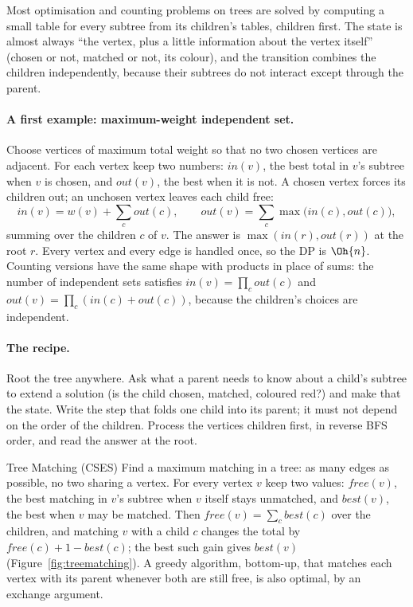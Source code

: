 Most optimisation and counting problems on trees are solved by computing a small table for every subtree from its children's tables,
children first. The state is almost always ``the vertex, plus a little information about the vertex itself'' (chosen or not, matched
or not, its colour), and the transition combines the children independently, because their subtrees do not interact except through
the parent.

\paragraph{A first example: maximum-weight independent set.} Choose vertices of maximum total weight so that no two chosen vertices
are adjacent. For each vertex keep two numbers: $\mathit{in}(v)$, the best total in $v$'s subtree when $v$ is chosen, and
$\mathit{out}(v)$, the best when it is not. A chosen vertex forces its children out; an unchosen vertex leaves each child free:
\[
  \mathit{in}(v) = w(v) + \sum_{c} \mathit{out}(c), \qquad \mathit{out}(v) = \sum_{c} \max\bigl(\mathit{in}(c), \mathit{out}(c)\bigr),
\]
summing over the children $c$ of $v$. The answer is $\max(\mathit{in}(r), \mathit{out}(r))$ at the root $r$. Every vertex and every
edge is handled once, so the DP is $\Oh{n}$. Counting versions have the same shape with products in place of sums: the number of
independent sets satisfies $\mathit{in}(v) = \prod_c \mathit{out}(c)$ and $\mathit{out}(v) = \prod_c (\mathit{in}(c) +
\mathit{out}(c))$, because the children's choices are independent.

\paragraph{The recipe.} Root the tree anywhere. Ask what a parent needs to know about a child's subtree to extend a solution (is the
child chosen, matched, coloured red?) and make that the state. Write the step that folds one child into its parent; it must not
depend on the order of the children. Process the vertices children first, in reverse BFS order, and read the answer at the root.

\begin{problem}{Tree Matching (CSES)}
Find a maximum matching in a tree: as many edges as possible, no two sharing a vertex.
\solution For every vertex $v$ keep two values: $\mathit{free}(v)$, the best matching in $v$'s subtree when $v$ itself stays
unmatched, and $\mathit{best}(v)$, the best when $v$ may be matched. Then $\mathit{free}(v) = \sum_c \mathit{best}(c)$ over the
children, and matching $v$ with a child $c$ changes the total by $\mathit{free}(c) + 1 - \mathit{best}(c)$; the best such gain
gives $\mathit{best}(v)$ (Figure~\ref{fig:treematching}). A greedy algorithm, bottom-up, that matches each vertex with its parent
whenever both are still free, is also optimal, by an exchange argument.
\end{problem}

